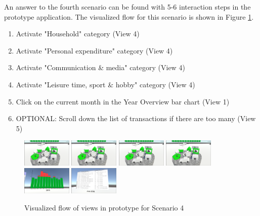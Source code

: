 An answer to the fourth scenario can be found with 5-6 interaction steps in the prototype application. The visualized flow for this scenario is shown in Figure \ref{fig:scenariofourprototype}.
\begin{enumerate}
	\item Activate "Household" category (View 4)
	\item Activate "Personal expenditure" category (View 4)
	\item Activate "Communication \& media" category (View 4)
	\item Activate "Leisure time, sport \& hobby" category (View 4)
	\item Click on the current month in the Year Overview bar chart (View 1)
	\item OPTIONAL: Scroll down the list of transactions if there are too many (View 5)
\end{enumerate}
\begin{figure}[h]
	\begin{center}
		\includegraphics[width=2.35cm]{03_Figures/08_Development/View4_CategoriesFiltering.png}
		\includegraphics[width=2.35cm]{03_Figures/08_Development/View4_CategoriesFiltering.png}
		\includegraphics[width=2.35cm]{03_Figures/08_Development/View4_CategoriesFiltering.png}
		\includegraphics[width=2.35cm]{03_Figures/08_Development/View4_CategoriesFiltering.png}
		\includegraphics[width=2.35cm]{03_Figures/08_Development/View1_YearOverview.png}
		\includegraphics[width=2.35cm]{03_Figures/08_Development/View5_FinTransactionsOverview.png}
		\caption{Visualized flow of views in prototype for Scenario 4}
		\label{fig:scenariofourprototype}
	\end{center}
\end{figure}

